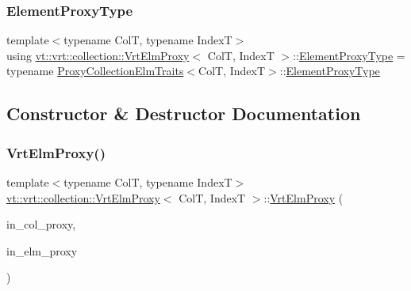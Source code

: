 \subsubsection{\texorpdfstring{Element\+Proxy\+Type}{ElementProxyType}}
{\footnotesize\ttfamily template$<$typename ColT, typename IndexT$>$ \\
using \hyperlink{structvt_1_1vrt_1_1collection_1_1_vrt_elm_proxy}{vt\+::vrt\+::collection\+::\+Vrt\+Elm\+Proxy}$<$ ColT, IndexT $>$\+::\hyperlink{structvt_1_1vrt_1_1collection_1_1_vrt_elm_proxy_aacc04b2ee9b318fba6f8641fec4b1316}{Element\+Proxy\+Type} =  typename \hyperlink{structvt_1_1vrt_1_1collection_1_1_proxy_collection_elm_traits}{Proxy\+Collection\+Elm\+Traits}$<$ColT, IndexT$>$\+::\hyperlink{structvt_1_1vrt_1_1collection_1_1_vrt_elm_proxy_aacc04b2ee9b318fba6f8641fec4b1316}{Element\+Proxy\+Type}}



\subsection{Constructor \& Destructor Documentation}
\mbox{\label{structvt_1_1vrt_1_1collection_1_1_vrt_elm_proxy_adb4f84aeca6d61b39b1a460c0b4f215a}} 
\subsubsection{\texorpdfstring{Vrt\+Elm\+Proxy()}{VrtElmProxy()}\hspace{0.1cm}{\footnotesize\ttfamily [1/5]}}
{\footnotesize\ttfamily template$<$typename ColT, typename IndexT$>$ \\
\hyperlink{structvt_1_1vrt_1_1collection_1_1_vrt_elm_proxy}{vt\+::vrt\+::collection\+::\+Vrt\+Elm\+Proxy}$<$ ColT, IndexT $>$\+::\hyperlink{structvt_1_1vrt_1_1collection_1_1_vrt_elm_proxy}{Vrt\+Elm\+Proxy} (\begin{DoxyParamCaption}\item[{\hyperlink{namespacevt_a1b417dd5d684f045bb58a0ede70045ac}{Virtual\+Proxy\+Type} const \&}]{in\+\_\+col\+\_\+proxy,  }\item[{\hyperlink{structvt_1_1vrt_1_1collection_1_1_base_elm_proxy}{Base\+Elm\+Proxy}$<$ IndexT $>$ const \&}]{in\+\_\+elm\+\_\+proxy }\end{DoxyParamCaption})\hspace{0.3cm}{\ttfamily [inline]}}

